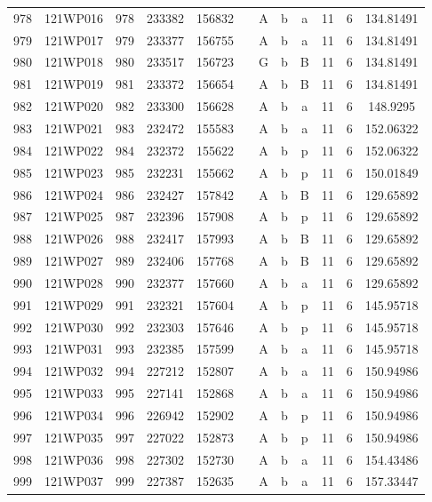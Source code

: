 \begin{tabular}{|*{12}{c|}}
978 & 121WP016 & 978 & 233382 & 156832 &  & A & b & a & 11 & 6 & 134.81491 \\ 
979 & 121WP017 & 979 & 233377 & 156755 &  & A & b & a & 11 & 6 & 134.81491 \\ 
980 & 121WP018 & 980 & 233517 & 156723 &  & G & b & B & 11 & 6 & 134.81491 \\ 
981 & 121WP019 & 981 & 233372 & 156654 &  & A & b & B & 11 & 6 & 134.81491 \\ 
982 & 121WP020 & 982 & 233300 & 156628 &  & A & b & a & 11 & 6 & 148.9295 \\ 
983 & 121WP021 & 983 & 232472 & 155583 &  & A & b & a & 11 & 6 & 152.06322 \\ 
984 & 121WP022 & 984 & 232372 & 155622 &  & A & b & p & 11 & 6 & 152.06322 \\ 
985 & 121WP023 & 985 & 232231 & 155662 &  & A & b & p & 11 & 6 & 150.01849 \\ 
986 & 121WP024 & 986 & 232427 & 157842 &  & A & b & B & 11 & 6 & 129.65892 \\ 
987 & 121WP025 & 987 & 232396 & 157908 &  & A & b & p & 11 & 6 & 129.65892 \\ 
988 & 121WP026 & 988 & 232417 & 157993 &  & A & b & B & 11 & 6 & 129.65892 \\ 
989 & 121WP027 & 989 & 232406 & 157768 &  & A & b & B & 11 & 6 & 129.65892 \\ 
990 & 121WP028 & 990 & 232377 & 157660 &  & A & b & a & 11 & 6 & 129.65892 \\ 
991 & 121WP029 & 991 & 232321 & 157604 &  & A & b & p & 11 & 6 & 145.95718 \\ 
992 & 121WP030 & 992 & 232303 & 157646 &  & A & b & p & 11 & 6 & 145.95718 \\ 
993 & 121WP031 & 993 & 232385 & 157599 &  & A & b & a & 11 & 6 & 145.95718 \\ 
994 & 121WP032 & 994 & 227212 & 152807 &  & A & b & a & 11 & 6 & 150.94986 \\ 
995 & 121WP033 & 995 & 227141 & 152868 &  & A & b & a & 11 & 6 & 150.94986 \\ 
996 & 121WP034 & 996 & 226942 & 152902 &  & A & b & p & 11 & 6 & 150.94986 \\ 
997 & 121WP035 & 997 & 227022 & 152873 &  & A & b & p & 11 & 6 & 150.94986 \\ 
998 & 121WP036 & 998 & 227302 & 152730 &  & A & b & a & 11 & 6 & 154.43486 \\ 
999 & 121WP037 & 999 & 227387 & 152635 &  & A & b & a & 11 & 6 & 157.33447 \\ 

\end{tabular}
